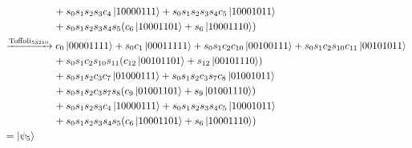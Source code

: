 \documentclass[11pt, oneside]{article}   	%
\begin{document}
\begin{align*}
& \hspace{5em} 
+ s_0 s_1 s_2 s_3 c_4 \ket{10000111}
+ s_0 s_1 s_2 s_3 s_4 c_5 \ket{10001011} \\
& \hspace{5em} 
+ s_0 s_1 s_2 s_3 s_4 s_5 (c_6 \ket{10001101} + s_6 \ket{10001110} ) \\
&\xrightarrow{\text{Toffoli}_{53210}} 
c_0 \ket{00001111} 
+ s_0 c_1 \ket{00011111}
+ s_0 s_1 c_2 c_{10} \ket{00100111}
+ s_0 s_1 c_2 s_{10} c_{11} \ket{00101011} \\
& \hspace{5em} 
+ s_0 s_1 c_2 s_{10} s_{11} (c_{12} \ket{00101101} + s_{12} \ket{00101110}) \\
& \hspace{5em} 
+ s_0 s_1 s_2 c_3 c_7 \ket{01000111}
+ s_0 s_1 s_2 c_3 s_7 c_8 \ket{01001011} \\
& \hspace{5em} 
+ s_0 s_1 s_2 c_3 s_7 s_8 (c_9 \ket{01001101} + s_9 \ket{01001110}) \\
& \hspace{5em} 
+ s_0 s_1 s_2 s_3 c_4 \ket{10000111}
+ s_0 s_1 s_2 s_3 s_4 c_5 \ket{10001011} \\
& \hspace{5em} 
+ s_0 s_1 s_2 s_3 s_4 s_5 (c_6 \ket{10001101} + s_6 \ket{10001110} ) \\
& = \ket{\psi_5} 
\end{align*}
\end{document}

